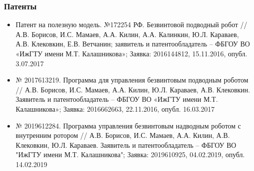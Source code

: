 \begin{frame}
\frametitle{Патенты}
\begin{itemize}
	
	
	
	\item Патент на полезную модель. №172254 РФ. Безвинтовой подводный робот //  А.В. Борисов, И.С. Мамаев, А.А. Килин, А.А. Калинкин, Ю.Л. Караваев, А.В. Клековкин, Е.В. Ветчанин; заявитель и патентообладатель – ФБГОУ ВО «ИжГТУ имени М.Т. Калашникова»; Заявка: 2016144812, 15.11.2016, опубл. 3.07.2017
	
	
	\item № 2017613219. Программа для управления безвинтовым подводным роботом // А.В. Борисов, И.С. Мамаев, А.А. Килин, Ю.Л. Караваев, А.В. Клековкин. Заявитель и патентообладатель – ФБГОУ ВО «ИжГТУ имени М.Т. Калашникова»; Заявка: 2016662663, 22.11.2016, опубл. 16.03.2017
	
	
	\item № 2019612284. Программа управления безвинтовым надводным роботом с внутренним ротором // А.В. Борисов, И.С. Мамаев, А.А. Килин, А.В. Клековкин, Ю.Л. Караваев. Заявитель и патентообладатель – ФБГОУ ВО "ИжГТУ имени М.Т. Калашникова"; Заявка: 2019610925, 04.02.2019, опубл. 14.02.2019
	
	
\end{itemize}
\end{frame}

%
